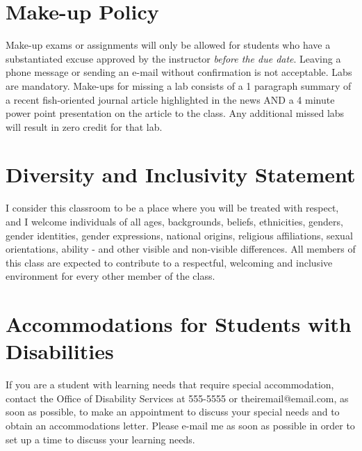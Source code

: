 \documentclass[letterpaper]{modular_syllabus} %
\begin{document}

\newpage %

\makeSide %


\vspace{0.5cm}
\section{Make-up Policy}

Make-up exams or assignments will only be allowed for students who have a substantiated excuse approved by the instructor \emph{before the due date}. Leaving a phone message or sending an e-mail without confirmation is not acceptable. Labs are mandatory. Make-ups for missing a lab consists of a 1 paragraph summary of a recent fish-oriented journal article highlighted in the news AND a 4 minute power point presentation on the article to the class. Any additional missed labs will result in zero credit for that lab.

\vspace{0.5cm}
\section{Diversity and Inclusivity Statement}

I consider this classroom to be a place where you will be treated with respect, and I welcome individuals of all ages, backgrounds, beliefs, ethnicities, genders, gender identities, gender expressions, national origins, religious affiliations, sexual orientations, ability - and other visible and non-visible differences. All members of this class are expected to contribute to a respectful, welcoming and inclusive environment for every other member of the class.

\vspace{0.5cm}
\section{Accommodations for Students with Disabilities}

If you are a student with learning needs that require special accommodation, contact the Office of Disability Services at 555-5555 or theiremail@email.com, as soon as possible, to make an appointment to discuss your special needs and to obtain an accommodations letter.  Please e-mail me as soon as possible in order to set up a time to discuss your learning needs.
\end{document}
